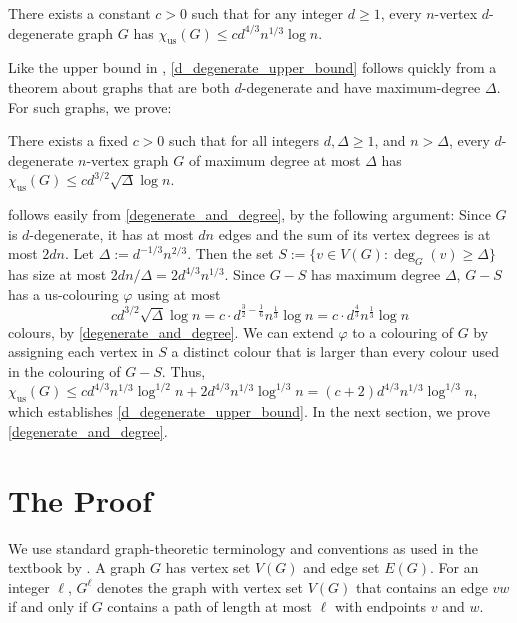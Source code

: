 \documentclass{patmorin}
\newcommand{\trn}{\chi_{\mathrm{us}}}
\begin{document}
\begin{thm}\label{d_degenerate_upper_bound}
  There exists a constant $c>0$ such that for any integer $d\ge 1$, every $n$-vertex $d$-degenerate graph $G$ has $\trn(G) \le c d^{4/3}n^{1/3}\log n$.
\end{thm}

Like the upper bound in \cite{karpas.neiman.ea:on}, \cref{d_degenerate_upper_bound} follows quickly from a theorem about graphs that are both $d$-degenerate and have maximum-degree $\Delta$. For such graphs, we prove:

\begin{thm}\label{degenerate_and_degree}
  There exists a fixed $c>0$ such that
  for all integers $d,\Delta \ge 1$, and $n> \Delta$, every $d$-degenerate $n$-vertex graph $G$ of maximum degree at most $\Delta$ has
  $\trn(G)\leq cd^{3/2}\sqrt{\Delta}\log n$.
\end{thm}

 follows easily from \cref{degenerate_and_degree}, by the following argument:  Since $G$ is $d$-degenerate, it has at most $dn$ edges and the sum of its vertex degrees is at most $2dn$.  Let $\Delta:=d^{-1/3}n^{2/3}$. Then the set $S:=\{v\in V(G):\deg_G(v)\ge \Delta\}$ has size at most $2dn/\Delta=2d^{4/3}n^{1/3}$.  Since $G-S$ has maximum degree $\Delta$, $G-S$ has a us-colouring $\varphi$ using at most
\[
  cd^{3/2}\sqrt{\Delta}\log n
  = c\cdot d^{\tfrac{3}{2}-\tfrac{1}{6}}n^{\tfrac{1}{3}}\log n
  = c\cdot d^{\tfrac{4}{3}}n^{\tfrac{1}{3}}\log n
\]
 colours, by \cref{degenerate_and_degree}. We can extend $\varphi$ to a colouring of $G$ by assigning each vertex in $S$ a distinct colour that is larger than every colour used in the colouring of $G-S$.  Thus, $\trn(G)\le cd^{4/3}n^{1/3}\log^{1/2} n+2d^{4/3}n^{1/3}\log^{1/3} n= (c+2)d^{4/3}n^{1/3}\log^{1/3} n$, which establishes \cref{d_degenerate_upper_bound}.  In the next section, we prove \cref{degenerate_and_degree}.

\section{The Proof}

We use standard graph-theoretic terminology and conventions as used in the textbook by \citet{diestel:graph}. A graph $G$ has vertex set $V(G)$ and edge set $E(G)$.  For an integer $\ell$, $G^\ell$ denotes the graph with vertex set $V(G)$ that contains an edge $vw$ if and only if $G$ contains a path of length at most $\ell$ with endpoints $v$ and $w$.
\end{document}
